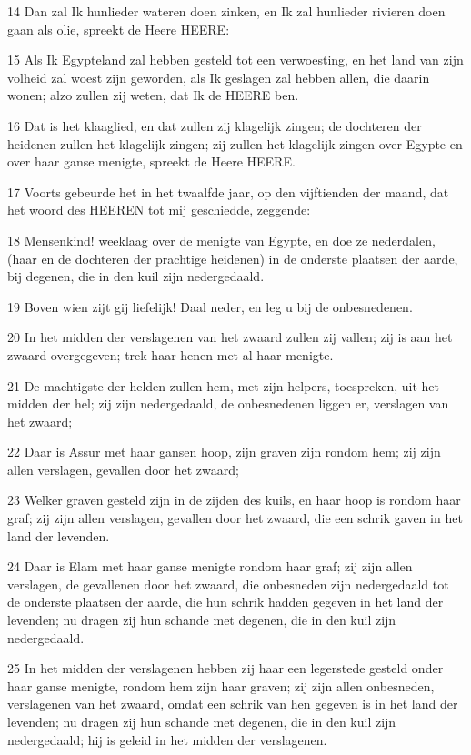 \par 14 Dan zal Ik hunlieder wateren doen zinken, en Ik zal hunlieder rivieren doen gaan als olie, spreekt de Heere HEERE:
\par 15 Als Ik Egypteland zal hebben gesteld tot een verwoesting, en het land van zijn volheid zal woest zijn geworden, als Ik geslagen zal hebben allen, die daarin wonen; alzo zullen zij weten, dat Ik de HEERE ben.
\par 16 Dat is het klaaglied, en dat zullen zij klagelijk zingen; de dochteren der heidenen zullen het klagelijk zingen; zij zullen het klagelijk zingen over Egypte en over haar ganse menigte, spreekt de Heere HEERE.
\par 17 Voorts gebeurde het in het twaalfde jaar, op den vijftienden der maand, dat het woord des HEEREN tot mij geschiedde, zeggende:
\par 18 Mensenkind! weeklaag over de menigte van Egypte, en doe ze nederdalen, (haar en de dochteren der prachtige heidenen) in de onderste plaatsen der aarde, bij degenen, die in den kuil zijn nedergedaald.
\par 19 Boven wien zijt gij liefelijk! Daal neder, en leg u bij de onbesnedenen.
\par 20 In het midden der verslagenen van het zwaard zullen zij vallen; zij is aan het zwaard overgegeven; trek haar henen met al haar menigte.
\par 21 De machtigste der helden zullen hem, met zijn helpers, toespreken, uit het midden der hel; zij zijn nedergedaald, de onbesnedenen liggen er, verslagen van het zwaard;
\par 22 Daar is Assur met haar gansen hoop, zijn graven zijn rondom hem; zij zijn allen verslagen, gevallen door het zwaard;
\par 23 Welker graven gesteld zijn in de zijden des kuils, en haar hoop is rondom haar graf; zij zijn allen verslagen, gevallen door het zwaard, die een schrik gaven in het land der levenden.
\par 24 Daar is Elam met haar ganse menigte rondom haar graf; zij zijn allen verslagen, de gevallenen door het zwaard, die onbesneden zijn nedergedaald tot de onderste plaatsen der aarde, die hun schrik hadden gegeven in het land der levenden; nu dragen zij hun schande met degenen, die in den kuil zijn nedergedaald.
\par 25 In het midden der verslagenen hebben zij haar een legerstede gesteld onder haar ganse menigte, rondom hem zijn haar graven; zij zijn allen onbesneden, verslagenen van het zwaard, omdat een schrik van hen gegeven is in het land der levenden; nu dragen zij hun schande met degenen, die in den kuil zijn nedergedaald; hij is geleid in het midden der verslagenen.
